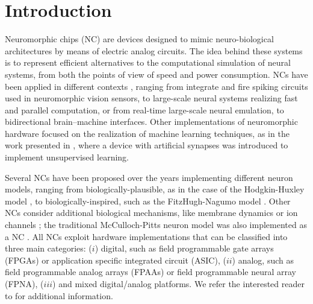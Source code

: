 \documentclass[utf8]{frontiersFPHY} %
\begin{document}
\section{Introduction}
Neuromorphic chips (NC) are devices designed to mimic neuro-biological architectures by means of electric analog circuits. 
The idea behind these systems is to represent efficient alternatives to the computational simulation of neural systems, from both the points of view of speed and power consumption. 
NCs have been applied in different contexts \cite{indiveri2011neuromorphic}, ranging from integrate and fire spiking circuits used in neuromorphic vision sensors, to large-scale neural systems realizing fast and parallel computation, or from real-time large-scale neural emulation, to bidirectional brain–machine interfaces.
Other implementations of neuromorphic hardware focused on the realization of machine learning techniques, as in the work presented in \cite{covi2016analog}, where a device with artificial synapses was introduced to implement unsupervised learning.

Several NCs have been proposed over the years implementing different neuron models, ranging from biologically-plausible, as in the case of the Hodgkin-Huxley model \cite{hodgkin1952quantitative}, to biologically-inspired, such as the FitzHugh-Nagumo model \cite{binczak2006experimental}. 
Other NCs
consider additional biological mechanisms, like membrane dynamics \cite{arthur2006silicon} or ion channels \cite{basu2010nullcline}; the traditional McCulloch-Pitts neuron model was also implemented as a NC \cite{mcculloch1943logical}.
All NCs exploit hardware implementations that can be classified into three main categories: ($i$) digital, such as field programmable gate arrays (FPGAs) or application specific integrated circuit
(ASIC), ($ii$) analog, such as field programmable analog arrays (FPAAs) or field programmable neural array (FPNA), ($iii$) and mixed digital/analog platforms.
We refer the interested reader to \cite{schuman2017survey} for additional information. 
\end{document}
